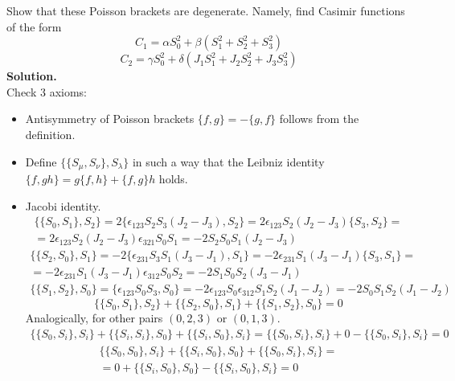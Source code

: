 \documentclass[12pt]{article}
\theoremstyle{definition}
\begin{document}
\begin{enumerate}
    Show that these Poisson brackets are degenerate. Namely, find Casimir functions of the form
    \begin{equation}
        C_1=\alpha S_0^2+\beta(S_1^2+S_2^2+S_3^2)
    \end{equation}
    \begin{equation}
        C_2=\gamma S_0^2+\delta(J_1S_1^2+J_2S_2^2+J_3S_3^2)
    \end{equation}
    \textbf{Solution.}\\
    Check 3 axioms:
    \begin{itemize}
    \item Antisymmetry of Poisson brackets $\{f,g\}=-\{g,f\}$ follows from the definition.
    \item Define $\{\{S_\mu,S_\nu\},S_\lambda\}$ in such a way that the Leibniz identity $\{f,gh\}=g\{f,h\}+\{f,g\}h$ holds.
    \item Jacobi identity.
        \begin{multline}
            \{\{S_0,S_1\},S_2\}=2\{\epsilon_{123}S_2S_3(J_2-J_3),S_2\}=2\epsilon_{123}S_2(J_2-J_3)\{S_3,S_2\}=\\=2\epsilon_{123}S_2(J_2-J_3)\epsilon_{321}S_0S_1=-2S_2S_0S_1(J_2-J_3)
        \end{multline}
        \begin{multline}
            \{\{S_2,S_0\},S_1\}=-2\{\epsilon_{231}S_3S_1(J_3-J_1),S_1\}=-2\epsilon_{231}S_1(J_3-J_1)\{S_3,S_1\}=\\=-2\epsilon_{231}S_1(J_3-J_1)\epsilon_{312}S_0S_2=-2S_1S_0S_2(J_3-J_1)
        \end{multline}
        \begin{multline}
            \{\{S_1,S_2\},S_0\}=\{\epsilon_{123}S_0S_3,S_0\}=-2\epsilon_{123}S_0\epsilon_{312}S_1S_2(J_1-J_2)=-2S_0S_1S_2(J_1-J_2)
        \end{multline}
        \begin{equation}
            \{\{S_0,S_1\},S_2\}+\{\{S_2,S_0\},S_1\}+\{\{S_1,S_2\},S_0\}=0
        \end{equation}
        Analogically, for other pairs $(0,2,3)$ or $(0,1,3)$.
        \begin{multline}
            \{\{S_0,S_i\},S_i\}+\{\{S_i,S_i\},S_0\}+\{\{S_i,S_0\},S_i\}=\{\{S_0,S_i\},S_i\}+0-\{\{S_0,S_i\},S_i\}=0
        \end{multline}
        \begin{multline}
            \{\{S_0,S_0\},S_i\}+\{\{S_i,S_0\},S_0\}+\{\{S_0,S_i\},S_i\}=\\=0+\{\{S_i,S_0\},S_0\}-\{\{S_i,S_0\},S_i\}=0

\end{multline}
\end{itemize}
\end{enumerate}
\end{document}
